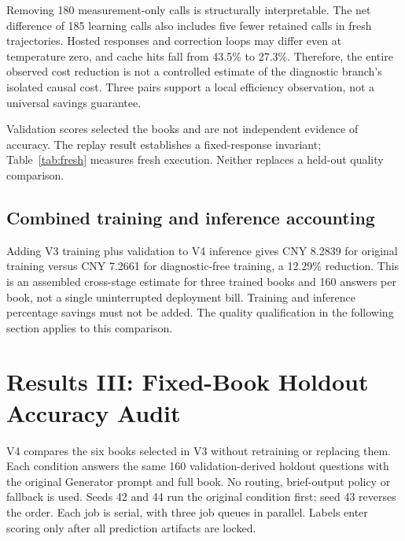 \documentclass[10pt,a4paper]{article}
\begin{document}
Removing 180 measurement-only calls is structurally interpretable. The net difference of 185 learning calls also includes five fewer retained calls in fresh trajectories. Hosted responses and correction loops may differ even at temperature zero, and cache hits fall from 43.5\% to 27.3\%. Therefore, the entire observed cost reduction is not a controlled estimate of the diagnostic branch's isolated causal cost. Three pairs support a local efficiency observation, not a universal savings guarantee.

Validation scores selected the books and are not independent evidence of accuracy. The replay result establishes a fixed-response invariant; Table~\ref{tab:fresh} measures fresh execution. Neither replaces a held-out quality comparison.

\subsection{Combined training and inference accounting}
Adding V3 training plus validation to V4 inference gives CNY 8.2839 for original training versus CNY 7.2661 for diagnostic-free training, a 12.29\% reduction. This is an assembled cross-stage estimate for three trained books and 160 answers per book, not a single uninterrupted deployment bill. Training and inference percentage savings must not be added. The quality qualification in the following section applies to this comparison.

\clearpage
\section{Results III: Fixed-Book Holdout Accuracy Audit}
V4 compares the six books selected in V3 without retraining or replacing them. Each condition answers the same 160 validation-derived holdout questions with the original Generator prompt and full book. No routing, brief-output policy or fallback is used. Seeds 42 and 44 run the original condition first; seed 43 reverses the order. Each job is serial, with three job queues in parallel. Labels enter scoring only after all prediction artifacts are locked.
\end{document}
